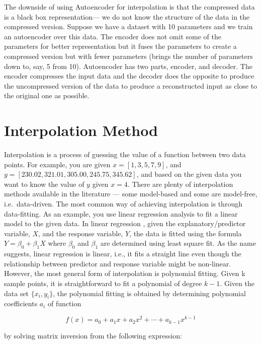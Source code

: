 \documentclass[onecolumn]{article}
\begin{document}
The downside of using Autoencoder for interpolation is that the
compressed data is a black box representation--- we do not know the
structure of the data in the compressed version. Suppose we have a
dataset with 10 parameters and we train an autoencoder over this data.
The encoder does not omit some of the parameters for better
representation but it fuses the parameters to create a compressed
version but with fewer parameters (brings the number of parameters down
to, say, 5 from 10). Autoencoder has two parts, encoder, and decoder.
The encoder compresses the input data and the decoder does the opposite
to produce the uncompressed version of the data to produce a
reconstructed input as close to the original one as possible.

\section{Interpolation Method}\label{interpolation-method}

Interpolation is a process of guessing the value of a function between
two data points. For example, you are given \(x = [1, 3, 5, 7, 9]\), and
\(y = [230.02, 321.01, 305.00, 245.75, 345.62]\), and based on the given
data you want to know the value of \(y\) given \(x = 4\). There are
plenty of interpolation methods available in the literature --- some
model-based and some are model-free, i.e.~data-driven. The most common
way of achieving interpolation is through data-fitting. As an example,
you use linear regression analysis to fit a linear model to the given
data. In linear regression \citep{kutner2005applied}, given the
explanatory/predictor variable, \(X\), and the response variable, \(Y\),
the data is fitted using the formula \(Y = \beta_0 + \beta_1 X\) where
\(\beta_0\) and \(\beta_1\) are determined using least square fit. As
the name suggests, linear regression is linear, i.e., it fits a straight
line even though the relationship between predictor and response
variable might be non-linear. However, the most general form of
interpolation is polynomial fitting. Given k sample points, it is
straightforward to fit a polynomial of degree \(k -1\). Given the data
set \(\{x_i, y_i\}\), the polynomial fitting is obtained by determining
polynomial coefficients \(a_i\) of function

\[
f(x) = a_0 + a_1 x  + a_2 x^2 + \cdots + a_{k-1}x^{k-1}
\]

by solving matrix inversion from the following expression:
\end{document}
